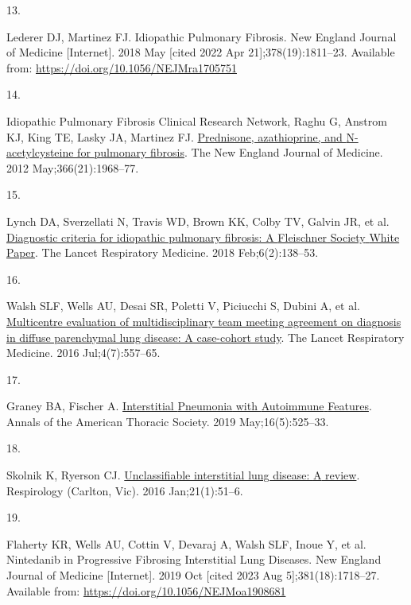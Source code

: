 \documentclass[
]{article}
\newlength{\cslhangindent}
\newlength{\csllabelwidth}
\newenvironment{CSLReferences}[2] %
 {\begin{list}{}{%
  \setlength{\itemindent}{0pt}
  \setlength{\leftmargin}{0pt}
  \setlength{\parsep}{0pt}
  \ifodd #1
   \setlength{\leftmargin}{\cslhangindent}
   \setlength{\itemindent}{-1\cslhangindent}
  \fi
  \setlength{\itemsep}{#2\baselineskip}}}
 {\end{list}}
\newcommand{\CSLLeftMargin}[1]{\parbox[t]{\csllabelwidth}{\strut#1\strut}}
\newcommand{\CSLRightInline}[1]{\parbox[t]{\linewidth - \csllabelwidth}{\strut#1\strut}}
\begin{document}
\begin{CSLReferences}{0}{1}
\CSLLeftMargin{13. }%
\CSLRightInline{Lederer DJ, Martinez FJ. Idiopathic {Pulmonary} {Fibrosis}. New England Journal of Medicine {[}Internet{]}. 2018 May {[}cited 2022 Apr 21{]};378(19):1811--23. Available from: \url{https://doi.org/10.1056/NEJMra1705751}}

\CSLLeftMargin{14. }%
\CSLRightInline{Idiopathic Pulmonary Fibrosis Clinical Research Network, Raghu G, Anstrom KJ, King TE, Lasky JA, Martinez FJ. \href{https://doi.org/10.1056/NEJMoa1113354}{Prednisone, azathioprine, and {N}-acetylcysteine for pulmonary fibrosis}. The New England Journal of Medicine. 2012 May;366(21):1968--77. }

\CSLLeftMargin{15. }%
\CSLRightInline{Lynch DA, Sverzellati N, Travis WD, Brown KK, Colby TV, Galvin JR, et al. \href{https://doi.org/10.1016/S2213-2600(17)30433-2}{Diagnostic criteria for idiopathic pulmonary fibrosis: A {Fleischner} {Society} {White} {Paper}}. The Lancet Respiratory Medicine. 2018 Feb;6(2):138--53. }

\CSLLeftMargin{16. }%
\CSLRightInline{Walsh SLF, Wells AU, Desai SR, Poletti V, Piciucchi S, Dubini A, et al. \href{https://doi.org/10.1016/S2213-2600(16)30033-9}{Multicentre evaluation of multidisciplinary team meeting agreement on diagnosis in diffuse parenchymal lung disease: A case-cohort study}. The Lancet Respiratory Medicine. 2016 Jul;4(7):557--65. }

\CSLLeftMargin{17. }%
\CSLRightInline{Graney BA, Fischer A. \href{https://doi.org/10.1513/AnnalsATS.201808-565CME}{Interstitial {Pneumonia} with {Autoimmune} {Features}}. Annals of the American Thoracic Society. 2019 May;16(5):525--33. }

\CSLLeftMargin{18. }%
\CSLRightInline{Skolnik K, Ryerson CJ. \href{https://doi.org/10.1111/resp.12568}{Unclassifiable interstitial lung disease: {A} review}. Respirology (Carlton, Vic). 2016 Jan;21(1):51--6. }

\CSLLeftMargin{19. }%
\CSLRightInline{Flaherty KR, Wells AU, Cottin V, Devaraj A, Walsh SLF, Inoue Y, et al. Nintedanib in {Progressive} {Fibrosing} {Interstitial} {Lung} {Diseases}. New England Journal of Medicine {[}Internet{]}. 2019 Oct {[}cited 2023 Aug 5{]};381(18):1718--27. Available from: \url{https://doi.org/10.1056/NEJMoa1908681}}


\end{CSLReferences}
\end{document}
